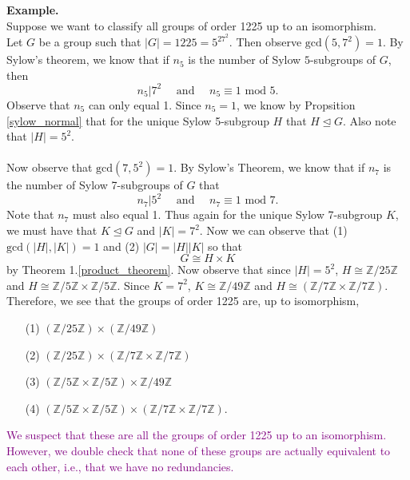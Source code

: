     \noindent
    \textbf{Example.}
    \\
    \textcolor{NavyBlue}{Suppose we want to classify all groups of order 1225 up to an
    isomorphism.}
    \\
    Let $G$ be a group such that $|G| = 1225 = 5^27^2$. Then observe
    $\mbox{gcd}(5, 7^2) = 1$. By Sylow's theorem, we know that 
    if $n_5$ is the number of Sylow $5$-subgroups of $G$, then 
    \[
        n_5 \big| 7^2 \quad \text{ and }\quad n_5 \equiv 1 \mbox{ mod } 5.
    \]
    Observe that $n_5$ can only equal 1. Since $n_5 = 1$, we know by
    Propsition \ref{sylow_normal} that
    for the unique Sylow 5-subgroup $H$ that $H \unlhd G$. Also note
    that $|H| = 5^2$.
    \\
    \\
    Now observe that $\mbox{gcd}(7, 5^2) = 1$. By Sylow's Theorem, we
    know that if $n_7$ is the number of Sylow 7-subgroups of $G$ that 
    \[
       n_7 \big| 5^2 \quad \text{ and }\quad n_7 \equiv 1 \mbox{ mod } 7.
    \]
    Note that $n_7$ must also equal 1. Thus again for the unique Sylow
    7-subgroup $K$, we must have that $K \unlhd G$ and $|K| = 7^2$. Now we can observe
    that (1) $\mbox{gcd}(|H|, |K|) = 1$ and (2) $|G| = |H||K|$ so that
    \[
        G \cong H \times K     
    \]
    by Theorem 1.\ref{product_theorem}. 
    Now observe that since $|H| = 5^2$, $H \cong
    \mathbb{Z}/25\mathbb{Z}$ and $H \cong \mathbb{Z}/5\mathbb{Z}
    \times \mathbb{Z}/5\mathbb{Z}$. Since $K = 7^2$, $K \cong 
    \mathbb{Z}/49\mathbb{Z}$ and $H \cong (\mathbb{Z}/7\mathbb{Z}
    \times \mathbb{Z}/7\mathbb{Z})$.
    Therefore, we see that the groups of order 1225 are, up to
    isomorphism, 
    \begin{itemize}
        \item[(1)] $(\mathbb{Z}/25\mathbb{Z}) \times (\mathbb{Z}/49\mathbb{Z})$
        \item[(2)] $(\mathbb{Z}/25\mathbb{Z}) \times
        (\mathbb{Z}/7\mathbb{Z} \times \mathbb{Z}/7\mathbb{Z})$
        \item[(3)] $(\mathbb{Z}/5\mathbb{Z} \times \mathbb{Z}/5\mathbb{Z})
        \times \mathbb{Z}/49\mathbb{Z}$
        \item[(4)] $(\mathbb{Z}/5\mathbb{Z} \times \mathbb{Z}/5\mathbb{Z})
        \times (\mathbb{Z}/7\mathbb{Z} \times
        \mathbb{Z}/7\mathbb{Z})$.
    \end{itemize}
    \textcolor{purple}{We suspect that these are all the groups of
    order 1225 up to an isomorphism. However, we double check that
    none of these groups are actually equivalent to each other, i.e.,
    that we have no redundancies.}

